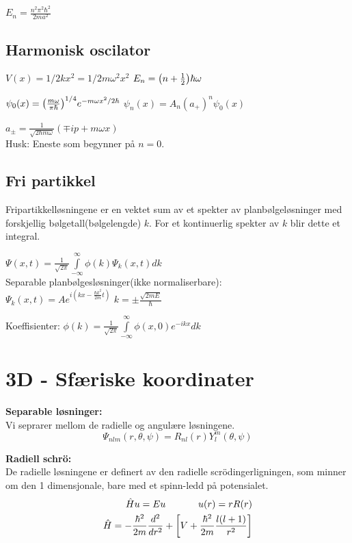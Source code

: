 \documentclass[10p,a4paper]{article}
\renewcommand{\exp}{e^}
\newcommand{\half}{\frac{1}{2}}
\begin{document}
$E_n = \frac{n^2\pi^2\hbar^2}{2ma^2}$


\subsection*{Harmonisk oscilator}
$V(x) = 1/2kx^2 = 1/2m\omega^2x^2$ \hspace{1cm} $E_n = \qty(n+\half)\hbar\omega$

$\psi_0(x) = \qty(\frac{m\omega}{\pi\hbar})^{1/4}\exp{-m\omega x^2 / 2\hbar}$ \hspace{1cm} $\psi_n(x) = A_n (a_+)^n \psi_0(x)$

$a_{\pm} = \frac{1}{\sqrt{2\hbar m \omega}}(\mp ip + m\omega x)$
\\

Husk: Eneste som begynner på $n=0$.


\subsection*{Fri partikkel}
Fripartikkelløsningene er en vektet sum av et spekter av planbølgeløsninger med forskjellig bølgetall(bølgelengde) $k$. For et kontinuerlig spekter av $k$ blir dette et integral.

$\Psi(x,t) = \frac{1}{\sqrt{2\pi}}\int\limits_{-\infty}^\infty\phi(k)\Psi_k(x,t) dk$ 
\\

Separable planbølgesløsninger(ikke normaliserbare):\\
$\Psi_k(x,t) = A\exp{i(kx-\frac{\hbar k^2}{2m}t)}$ \hspace{1cm} $k = \pm \frac{\sqrt{2mE}}{\hbar}$

Koeffisienter: $\phi(k) = \frac{1}{\sqrt{2\pi}}\int\limits_{-\infty}^\infty\phi(x,0)\exp{-ikx} dk$





\section*{3D - Sfæriske koordinater}
\textbf{Separable løsninger:}\\
Vi seprarer mellom de radielle og angulære løsningene.
\[ \Psi_{nlm}(r, \theta, \psi) = R_{nl}(r)Y_l^m(\theta, \psi) \]

\textbf{Radiell schrö:}\\
De radielle løsningene er definert av den radielle scrödingerligningen, som minner om den 1 dimensjonale, bare med et spinn-ledd på potensialet.
\begin{align*} \hat{H}u = Eu \hspace{1.2cm} u(r) = rR(r)\\
\hat{H} = -\frac{\hbar^2}{2m}\frac{d^2}{dr^2} + \qty[V + \frac{\hbar^2}{2m}\frac{l(l+1)}{r^2}]\end{align*}
\end{document}
